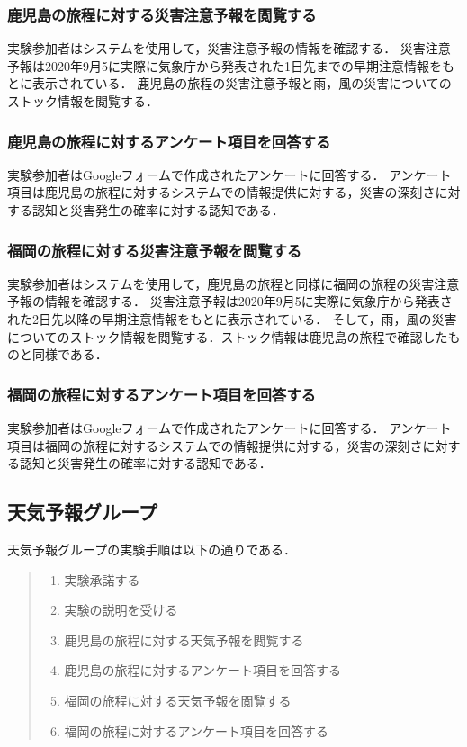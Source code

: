 \subsubsection{鹿児島の旅程に対する災害注意予報を閲覧する}
実験参加者はシステムを使用して，災害注意予報の情報を確認する．
災害注意予報は2020年9月5に実際に気象庁から発表された1日先までの早期注意情報をもとに表示されている．
鹿児島の旅程の災害注意予報と雨，風の災害についてのストック情報を閲覧する．

\subsubsection{鹿児島の旅程に対するアンケート項目を回答する}
実験参加者はGoogleフォームで作成されたアンケートに回答する．
アンケート項目は鹿児島の旅程に対するシステムでの情報提供に対する，災害の深刻さに対する認知と災害発生の確率に対する認知である．

\subsubsection{福岡の旅程に対する災害注意予報を閲覧する}
実験参加者はシステムを使用して，鹿児島の旅程と同様に福岡の旅程の災害注意予報の情報を確認する．
災害注意予報は2020年9月5に実際に気象庁から発表された2日先以降の早期注意情報をもとに表示されている．
そして，雨，風の災害についてのストック情報を閲覧する．ストック情報は鹿児島の旅程で確認したものと同様である．

\subsubsection{福岡の旅程に対するアンケート項目を回答する}
実験参加者はGoogleフォームで作成されたアンケートに回答する．
アンケート項目は福岡の旅程に対するシステムでの情報提供に対する，災害の深刻さに対する認知と災害発生の確率に対する認知である．

\subsection{天気予報グループ}
天気予報グループの実験手順は以下の通りである．

\begin{quote}
  \begin{enumerate}
    \item 実験承諾する
    \item 実験の説明を受ける
    \item 鹿児島の旅程に対する天気予報を閲覧する
    \item 鹿児島の旅程に対するアンケート項目を回答する
    \item 福岡の旅程に対する天気予報を閲覧する
    \item 福岡の旅程に対するアンケート項目を回答する
  \end{enumerate}
\end{quote}


